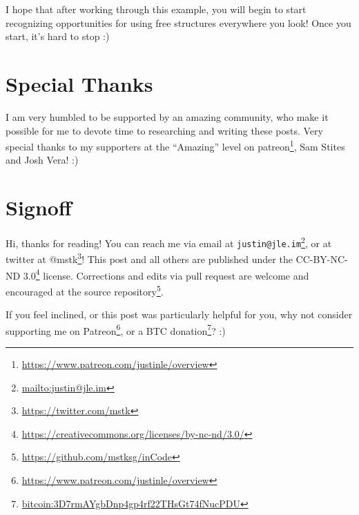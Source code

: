 \documentclass[]{article}
\renewcommand{\href}[2]{#2\footnote{\url{#1}}}
\begin{document}
I hope that after working through this example, you will begin to start
recognizing opportunities for using free structures everywhere you look! Once
you start, it's hard to stop :)

\hypertarget{special-thanks}{%
\section{Special Thanks}\label{special-thanks}}

I am very humbled to be supported by an amazing community, who make it possible
for me to devote time to researching and writing these posts. Very special
thanks to my supporters at the ``Amazing'' level on
\href{https://www.patreon.com/justinle/overview}{patreon}, Sam Stites and Josh
Vera! :)

\hypertarget{signoff}{%
\section{Signoff}\label{signoff}}

Hi, thanks for reading! You can reach me via email at
\href{mailto:justin@jle.im}{\nolinkurl{justin@jle.im}}, or at twitter at
\href{https://twitter.com/mstk}{@mstk}! This post and all others are published
under the \href{https://creativecommons.org/licenses/by-nc-nd/3.0/}{CC-BY-NC-ND
3.0} license. Corrections and edits via pull request are welcome and encouraged
at \href{https://github.com/mstksg/inCode}{the source repository}.

If you feel inclined, or this post was particularly helpful for you, why not
consider \href{https://www.patreon.com/justinle/overview}{supporting me on
Patreon}, or a \href{bitcoin:3D7rmAYgbDnp4gp4rf22THsGt74fNucPDU}{BTC donation}?
:)
\end{document}
